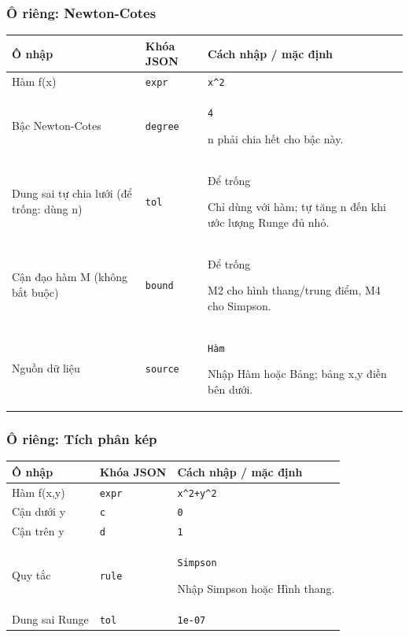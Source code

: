 \subsubsection*{Ô riêng: Newton-Cotes}
\begin{center}\small\begin{tabular}{@{}p{.32\linewidth}p{.17\linewidth}p{.43\linewidth}@{}}\toprule
Ô nhập & Khóa JSON & Cách nhập / mặc định\\\midrule
Hàm f(x) & \texttt{expr} & \texttt{x\textasciicircum{}2}\\[3pt]
Bậc Newton-Cotes & \texttt{degree} & \texttt{4}
\par n phải chia hết cho bậc này.\\[3pt]
Dung sai tự chia lưới (để trống: dùng n) & \texttt{tol} & Để trống
\par Chỉ dùng với hàm;\allowbreak{} tự tăng n đến khi ước lượng Runge đủ nhỏ.\\[3pt]
Cận đạo hàm M (không bắt buộc) & \texttt{bound} & Để trống
\par M2 cho hình thang/\allowbreak{}trung điểm,\allowbreak{} M4 cho Simpson.\\[3pt]
Nguồn dữ liệu & \texttt{source} & \texttt{Hàm}
\par Nhập Hàm hoặc Bảng;\allowbreak{} bảng x,\allowbreak{}y điền bên dưới.\\[3pt]
\bottomrule\end{tabular}\end{center}
\subsubsection*{Ô riêng: Tích phân kép}
\begin{center}\small\begin{tabular}{@{}p{.32\linewidth}p{.17\linewidth}p{.43\linewidth}@{}}\toprule
Ô nhập & Khóa JSON & Cách nhập / mặc định\\\midrule
Hàm f(x,\allowbreak{}y) & \texttt{expr} & \texttt{x\textasciicircum{}2+y\textasciicircum{}2}\\[3pt]
Cận dưới y & \texttt{c} & \texttt{0}\\[3pt]
Cận trên y & \texttt{d} & \texttt{1}\\[3pt]
Quy tắc & \texttt{rule} & \texttt{Simpson}
\par Nhập Simpson hoặc Hình thang.\\[3pt]
Dung sai Runge & \texttt{tol} & \texttt{1e-07}\\[3pt]
\bottomrule\end{tabular}\end{center}
